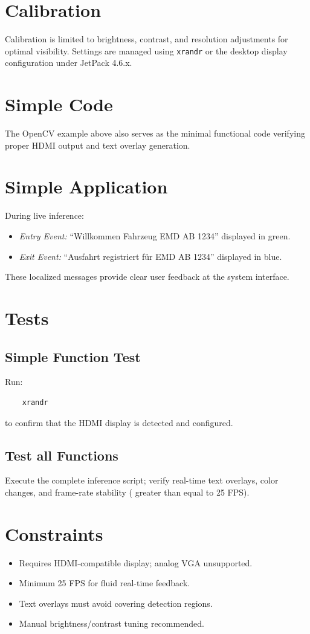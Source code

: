 \section{Calibration}
Calibration is limited to brightness, contrast, and resolution adjustments for optimal visibility.  
Settings are managed using \texttt{xrandr} or the desktop display configuration under JetPack 4.6.x.

\section{Simple Code}
The OpenCV example above also serves as the minimal functional code verifying proper HDMI output and text overlay generation.

\section{Simple Application}
During live inference:
\begin{itemize}
	\item \textit{Entry Event:} “Willkommen Fahrzeug EMD AB 1234” displayed in green.
	\item \textit{Exit Event:} “Ausfahrt registriert für EMD AB 1234” displayed in blue.
\end{itemize}
These localized messages provide clear user feedback at the system interface.

\section{Tests}
\subsection{Simple Function Test}
Run:
\begin{verbatim}
	xrandr
\end{verbatim}
to confirm that the HDMI display is detected and configured.

\subsection{Test all Functions}
Execute the complete inference script; verify real-time text overlays, color changes, and frame-rate stability ( greater than equal to 25 FPS).

\section{Constraints}
\begin{itemize}
	\item Requires HDMI-compatible display; analog VGA unsupported.  
	\item Minimum 25 FPS for fluid real-time feedback.  
	\item Text overlays must avoid covering detection regions.  
	\item Manual brightness/contrast tuning recommended.  
\end{itemize}

